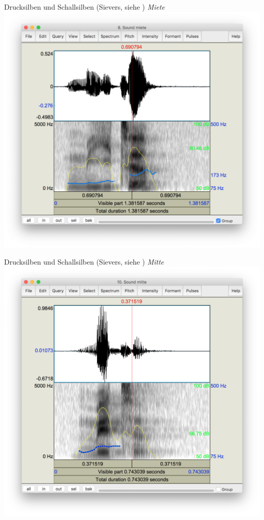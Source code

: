 \begin{frame}
  {Drucksilben und Schallsilben (Sievers, siehe \citealt{Maas2002})}
  \Large
  \textit{Miete}\\
  \Zeile
  \centering
  \includegraphics[height=0.8\textheight]{graphics/miete}
\end{frame}

\begin{frame}
  {Drucksilben und Schallsilben (Sievers, siehe \citealt{Maas2002})}
  \Large
  \textit{Mitte}\\
  \Zeile
  \centering
  \includegraphics[height=0.8\textheight]{graphics/mitte}
\end{frame}

